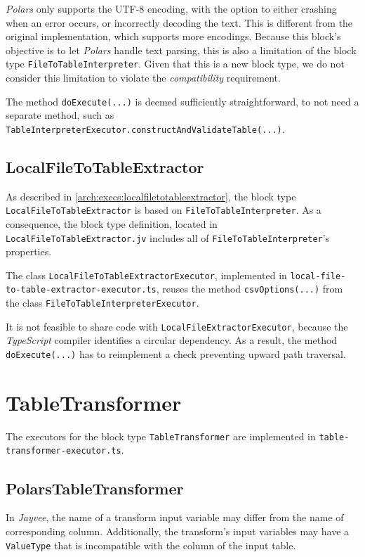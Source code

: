 \emph{Polars} only supports the \ac{UTF-8} encoding, with the option to either crashing when an error occurs, or incorrectly decoding the text.
This is different from the original implementation, which supports more encodings.
Because this block's objective is to let \emph{Polars} handle text parsing, this is also a limitation of the block type \Verb|FileToTableInterpreter|.
Given that this is a new block type, we do not consider this limitation to violate the \emph{compatibility} requirement.

The method \Verb|doExecute(...)| is deemed sufficiently straightforward, to not need a separate method, such as \Verb|TableInterpreterExecutor.constructAndValidateTable(...)|.


\subsection{LocalFileToTableExtractor}
As described in \autoref{arch:execs:localfiletotableextractor}, the block type \Verb|LocalFileToTableExtractor| is based on \Verb|FileToTableInterpreter|.
As a consequence, the block type definition, located in \Verb|LocalFileToTableExtractor.jv| includes all of \Verb|FileToTableInterpreter|'s properties.

The class \Verb|LocalFileToTableExtractorExecutor|, implemented in \Verb|local-file-to-table-extractor-executor.ts|, reuses the method \Verb|csvOptions(...)| from the class \Verb|FileToTableInterpreterExecutor|.

It is not feasible to share code with \Verb|LocalFileExtractorExecutor|, because the \emph{TypeScript} compiler identifies a circular dependency.
As a result, the method \Verb|doExecute(...)| has to reimplement a check preventing upward path traversal.


\section{TableTransformer}

The executors for the block type \Verb|TableTransformer| are implemented in \Verb|table-transformer-executor.ts|.

\subsection{PolarsTableTransformer}
\label{impl:polars_table_transformer}
In \emph{Jayvee}, the name of a transform input variable may differ from the name of corresponding column.
Additionally, the transform's input variables may have a \Verb|ValueType| that is incompatible with the column of the input table.

